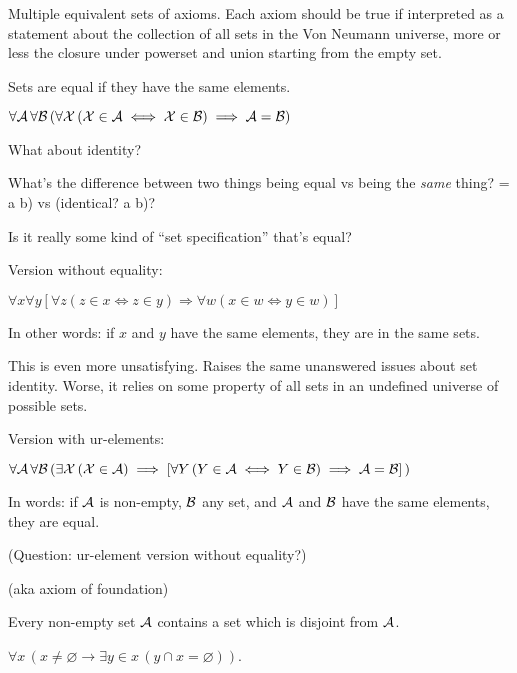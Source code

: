 Multiple equivalent sets of axioms.
Each axiom should be true if interpreted as a statement about the
collection of all sets in the Von Neumann 
universe\cite{wiki:Von_Neumann_universe},
more or less the closure under powerset and union starting
from the empty set.


Sets are equal if they have the same 
elements.\cite{wiki:Axiom_of_extensionality,wiki:Extensionality}

$\forall \mathcal{A}\,\forall \mathcal{B}\,
(\forall \mathcal{X}\,(\mathcal{X}\in \mathcal{A}\iff \mathcal{X}\in \mathcal{B})
\implies \mathcal{A}=\mathcal{B})$

What about identity? 

What's the difference between two things being equal vs
being the \textit{same} thing? 
\textsf{= a b)} vs \textsf{(identical? a b)}?

Is it really some kind of ``set specification'' that's equal?

Version without equality:

$\forall x
\forall y
[\forall z(z\in x\Leftrightarrow z\in y)
\Rightarrow 
\forall w(x\in w\Leftrightarrow y\in w)]$

In other words: if $x$ and $y$ have the same elements, 
they are in the same sets.

This is even more unsatisfying. 
Raises the same unanswered issues about set identity.
Worse, it relies on some property of all sets in an undefined 
universe of possible sets.

Version with ur-elements:

$\forall \mathcal{A}\,
\forall \mathcal{B}\,
(\exists \mathcal{X}\,(\mathcal{X}\in \mathcal{A})
\implies
 [\forall Y\,
 (Y\in \mathcal{A}
 \iff 
 Y\in \mathcal{B}) \implies \mathcal{A}=\mathcal{B}]\,)$
 
In words: 
if $\mathcal{\mathcal{A}}$ is non-empty, $\mathcal{B}$ any set, 
and $\mathcal{\mathcal{A}}$ and $\mathcal{B}$ have the same
elements, they are equal.

(Question: ur-element version without equality?)


(aka axiom of foundation)~\cite{wiki:Axiom_of_regularity}

Every non-empty set $\mathcal{A}$ contains a set which is disjoint from $\mathcal{A}$.

$\forall x\,(x \neq \varnothing
\rightarrow 
\exists y\in x\,(y\cap x=\varnothing ))$.
 
